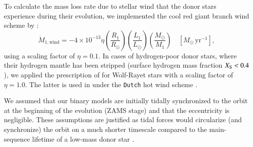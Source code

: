 \documentclass[main.tex]{subfiles}
\begin{document}
        To calculate the mass loss rate due to stellar wind that the donor stars experience during their evolution, we implemented the cool red giant branch wind scheme by \cite{Reimers:bk1975}:
        \begin{equation}
            \label{eq:reimers_mdot}
            \dot{M}_{1, \text{wind}} = -4 \times 10^{-13} \eta \left(\frac{R_1}{R_\odot}\right) \left(\frac{L_1}{L_\odot}\right)\left(\frac{M_\odot}{M_1}\right)\quad [M_\odot\,\text{yr}^{-1}],
        \end{equation}
        using a scaling factor of $\eta = 0.1$. In cases of hydrogen-poor donor stars, where their hydrogen mantle has been stripped (surface hydrogen mass fraction $X_{\rm S} < 0.4$), we applied the prescription of \cite{Nugis:aap2000} for Wolf-Rayet stars with a scaling factor of $\eta = 1.0$. The latter is used in \mesa under the \texttt{Dutch} hot wind scheme \citep[][]{Glebbeek:aap2009}. 
        
        We assumed that our binary models are initially tidally synchronized to the orbit at the beginning of the evolution (ZAMS stage) and that the eccentricity is negligible. These assumptions are justified as tidal forces would circularize (and synchronize) the orbit on a much shorter timescale compared to the main-sequence lifetime of a low-mass donor star \citep[e.g.,][]{Verbunt:aa1995}.
        
\end{document}
